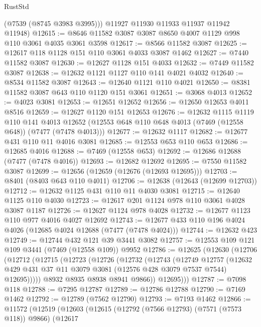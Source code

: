 \begin{lexlean}{RustStd}
\begin{coremodule}
        (@7539 (@8745 @3983 @3995)))
      @11927
      @11930
      @11933
      @11937
      @11942
      @11948)
@12615 := @8646 @11582 @3087 @3087 @8650 @4007 @1129 @998 @110 @3061 @4035 @3061 @3598
@12617 := @8566 @11582 @3087
@12625 := @12617 @118 @1128 @151 @110 @3061 @4033 @3087 @1462
@12627 := @7440 @11582 @3087
@12630 := @12627 @1128 @151 @4033
@12632 := @7449 @11582 @3087
@12638 := @12632 @1121 @1127 @110 @141 @4021 @4032
@12640 := @8534 @11582 @3087
@12643 := @12640 @1121 @110 @4021
@12650 := @8381 @11582 @3087 @643 @110 @1120 @151 @3061
@12651 := @3068 @4013
@12652 := @4023 @3081
@12653 := @12651 @12652
@12656 := @12650 @12653 @4011 @8516
@12659 := @12627 @1120 @151 @12653
@12676 := @12632
    @1115
    @1119
    @110
    @141
    @4013
    @12652
    (@12553 @648 @110 @648 @4013 (@7469 (@12558 @648)) (@7477 (@7478 @4013)))
@12677 := @12632 @1117
@12682 := @12677 @431 @110 @11 @4016 @3081
@12685 := @12553 @653 @110 @653
@12686 := @12685 @4016
@12688 := @7469 (@12558 @653)
@12692 := @12686 @12688 (@7477 (@7478 @4016))
@12693 := @12682 @12692
@12695 := @7550 @11582 @3087
@12699 := @12656 (@12659 (@12676 (@12693 @12695)))
@12703 := @8401 (@8403 @643 @110 @4011)
@12706 := @12638 (@12643 (@12699 @12703))
@12712 := @12632 @1125 @431 @110 @11 @4030 @3081
@12715 := @12640 @1125 @110 @4030
@12723 := @12617 @201 @1124 @978 @110 @3061 @4028 @3087 @1187
@12726 := @12627 @1124 @978 @4028
@12732 := @12677 @1123 @110 @977 @4016 @4027 @12692
@12743 := @12677 @433 @110 @196 @4024 @4026 (@12685 @4024 @12688 (@7477 (@7478 @4024)))
@12744 := @12632 @423
@12749 := @12744 @432 @121 @39 @3441 @3082
@12757 := @12553 @109 @121 @109 @3441 (@7469 (@12558 @109)) @9952
@12786 := @12625
    (@12630
      (@12706
        (@12712
          (@12715
            (@12723
              (@12726
                (@12732
                  (@12743
                    (@12749
                      @12757
                      (@12632
                        @429
                        @431
                        @37
                        @11
                        @3079
                        @3081
                        (@12576 @428 @3079 @7537 @7544)
                        @12695)))))
              @8932
              @8935
              @8938
              @8941
              @9866))
          @12695)))
@12787 := @7098 @118
@12788 := @7295 @12787
@12789 := @12786 @12788
@12790 := @7169 @1462
@12792 := @12789 (@7562 @12790)
@12793 := @7193 @1462
@12866 := @11572
    (@12519
      (@12603
        (@12615
          (@12792 (@7566 @12793) (@7571 (@7573 @118)) @9866)
          (@12617

\end{coremodule}
\end{lexlean}
